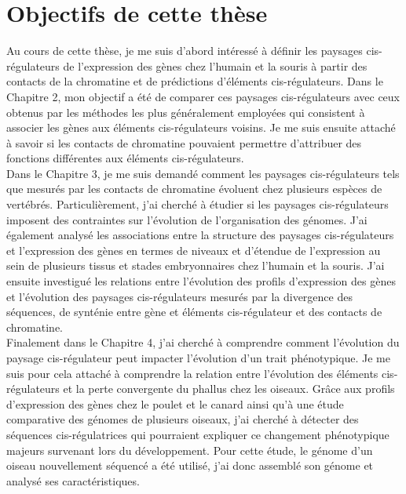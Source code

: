 \chapter{Objectifs de cette thèse}
\label{chap:objectifs}

Au cours de cette thèse, je me suis d’abord intéressé à définir les paysages \gls{cis}-régulateurs de l’expression des gènes chez l’humain et la souris à partir des contacts de la chromatine et de prédictions d’éléments \gls{cis}-régulateurs. Dans le Chapitre 2, mon objectif a été de comparer ces paysages \gls{cis}-régulateurs avec ceux obtenus par les méthodes les plus généralement employées qui consistent à associer les gènes aux éléments \gls{cis}-régulateurs voisins. Je me suis ensuite attaché à savoir si les contacts de chromatine pouvaient permettre d’attribuer des fonctions différentes aux éléments \gls{cis}-régulateurs.\\

Dans le Chapitre 3, je me suis demandé comment les paysages \gls{cis}-régulateurs tels que mesurés par les contacts de chromatine évoluent chez plusieurs espèces de vertébrés. Particulièrement, j’ai cherché à étudier si les paysages \gls{cis}-régulateurs imposent des contraintes sur l’évolution de l’organisation des génomes. J’ai également analysé les associations entre la structure des paysages \gls{cis}-régulateurs et l’expression des gènes en termes de niveaux et d’étendue de l’expression au sein de plusieurs tissus et stades embryonnaires chez l’humain et la souris. J’ai ensuite investigué les relations entre l’évolution des profils d’expression des gènes et l’évolution des paysages \gls{cis}-régulateurs mesurés par la divergence des séquences, de synténie entre gène et éléments \gls{cis}-régulateur et des contacts de chromatine.\\

Finalement dans le Chapitre 4, j’ai cherché à comprendre comment l’évolution du paysage \gls{cis}-régulateur peut impacter l’évolution d’un trait phénotypique. Je me suis pour cela attaché à comprendre la relation entre l’évolution des éléments \gls{cis}-régulateurs et la perte convergente du phallus chez les oiseaux. Grâce aux profils d’expression des gènes chez le poulet et le canard ainsi qu’à une étude comparative des génomes de plusieurs oiseaux, j’ai cherché à détecter des séquences \gls{cis}-régulatrices qui pourraient expliquer ce changement phénotypique majeurs survenant lors du développement. Pour cette étude, le génome d’un oiseau nouvellement séquencé a été utilisé, j’ai donc assemblé son génome et analysé ses caractéristiques.
